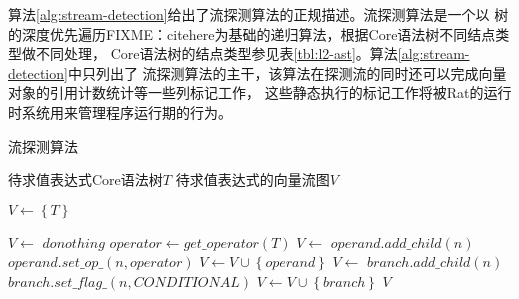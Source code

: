 
算法\ref{alg:stream-detection}给出了流探测算法的正规描述。流探测算法是一个以
树的深度优先遍历FIXME：citehere为基础的递归算法，根据Core语法树不同结点类型做不同处理，
Core语法树的结点类型参见表\ref{tbl:l2-ast}。算法\ref{alg:stream-detection}中只列出了
流探测算法的主干，该算法在探测流的同时还可以完成向量对象的引用计数统计等一些列标记工作，
这些静态执行的标记工作将被Rat的运行时系统用来管理程序运行期的行为。
\begin{algorithm}[htbp]
  \caption{流探测算法}
  \label{alg:stream-detection}
  \begin{algorithmic}[1]
    \Require 待求值表达式Core语法树$T$
    \Ensure 待求值表达式的向量流图$V$

      \State $V \leftarrow \left\{ T \right\}$
      \State \Return {}
    \EndFunction

      \State $V \leftarrow$ 
      \State $donothing$
      \State $operator \leftarrow get\_operator(T)$
      \State $V \leftarrow$ 
       {
        \State $operand.add\_child(n)$
        \State $operand.set\_op\_(n, operator)$
        \State $V \leftarrow V \cup \left\{ operand \right\}$
        \EndIf
      }
      \EndFor
      \State $V \leftarrow$ 
       {
        \State $branch.add\_child(n)$
        \State $branch.set\_flag\_(n, CONDITIONAL)$
        \State $V \leftarrow V \cup \left\{ branch \right\}$
        \EndIf
      }
      \EndFor
      \EndIf
      \State \Return $V$
    \EndFunction
  \end{algorithmic}
\end{algorithm}

